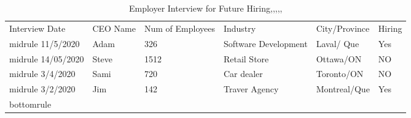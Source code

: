\begin{table}[!ht]
\begin{tabular}{|l|l|l|l|l|l|}
\toprule
Interview Date & CEO Name & Num of Employees & Industry & City/Province & Hiring & \\midrule
11/5/2020 & Adam & 326 & Software Development & Laval/ Que & Yes & \\midrule
14/05/2020 & Steve & 1512 & Retail Store & Ottawa/ON & NO & \\midrule
3/4/2020 & Sami & 720 & Car dealer & Toronto/ON & NO & \\midrule
3/2/2020 & Jim & 142 & Traver Agency & Montreal/Que & Yes & \\bottomrule
\end{tabular}
\caption{﻿Employer Interview for Future Hiring,,,,,}
\label{EmployerInterviewCVS}
\end{table}
